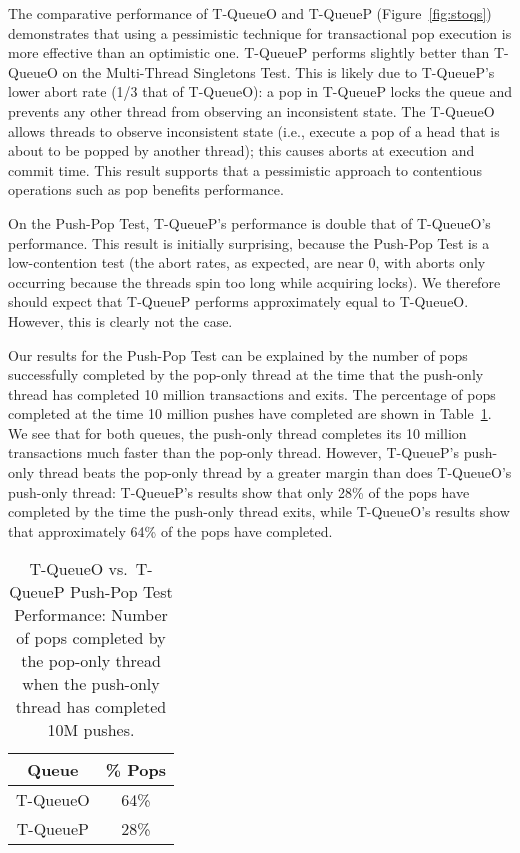 The comparative performance of T-QueueO and T-QueueP (Figure~\ref{fig:stoqs}) demonstrates that using a pessimistic technique for transactional pop execution is more effective than an optimistic one. 
T-QueueP performs slightly better than T-QueueO on the Multi-Thread Singletons Test. This is likely due to T-QueueP's lower abort rate (1/3 that of T-QueueO): a pop in T-QueueP locks the queue and prevents any other thread from observing an inconsistent state. The T-QueueO allows threads to observe inconsistent state (i.e., execute a pop of a head that is about to be popped by another thread); this causes aborts at execution and commit time.
This result supports that a pessimistic approach to contentious operations such as pop benefits performance.

On the Push-Pop Test, T-QueueP's performance is double that of T-QueueO's performance. This result is initially surprising, because the Push-Pop Test is a low-contention test (the abort rates, as expected, are near 0, with aborts only occurring because the threads spin too long while acquiring locks). We therefore should expect that T-QueueP performs approximately equal to T-QueueO. However, this is clearly not the case.

Our results for the Push-Pop Test can be explained by the number of pops successfully completed by the pop-only thread at the time that the push-only thread has completed 10 million transactions and exits. The percentage of pops completed at the time 10 million pushes have completed are shown in Table~\ref{tab:sto_pop_push_ratio}.
We see that for both queues, the push-only thread completes its 10 million transactions much faster than the pop-only thread. However, T-QueueP's push-only thread beats the pop-only thread by a greater margin than does T-QueueO's push-only thread: T-QueueP's results show that only 28\% of the pops have completed by the time the push-only thread exits, while T-QueueO's results show that approximately 64\% of the pops have completed.

\begin{table}[t]
        \centering
    \begin{tabular}{|cc|}
        \hline
        Queue & \% Pops\\
        \hline
            T-QueueO & 64\%\\
            T-QueueP & 28\%\\
        \hline
    \end{tabular}
    \caption{T-QueueO vs.\ T-QueueP Push-Pop Test Performance: Number of pops completed by the pop-only thread when the push-only thread has completed 10M pushes.}
    \label{tab:sto_pop_push_ratio}
\end{table}


